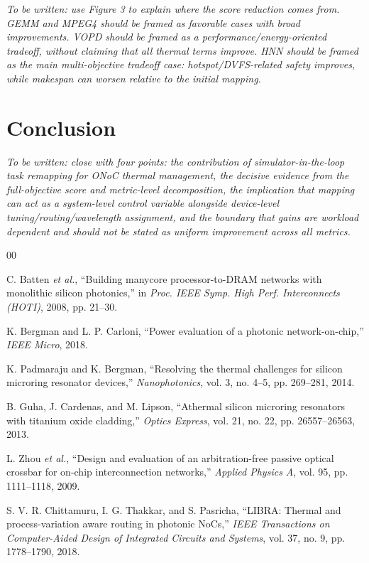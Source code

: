 \documentclass[conference]{IEEEtran}
\begin{document}
\noindent\textit{To be written: use Figure 3 to explain where the score reduction comes from. GEMM and MPEG4 should be framed as favorable cases with broad improvements. VOPD should be framed as a performance/energy-oriented tradeoff, without claiming that all thermal terms improve. HNN should be framed as the main multi-objective tradeoff case: hotspot/DVFS-related safety improves, while makespan can worsen relative to the initial mapping.}

\section{Conclusion}

\noindent\textit{To be written: close with four points: the contribution of simulator-in-the-loop task remapping for ONoC thermal management, the decisive evidence from the full-objective score and metric-level decomposition, the implication that mapping can act as a system-level control variable alongside device-level tuning/routing/wavelength assignment, and the boundary that gains are workload dependent and should not be stated as uniform improvement across all metrics.}

\begin{thebibliography}{00}

C. Batten \emph{et al.},
``Building manycore processor-to-DRAM networks with monolithic silicon photonics,''
in \emph{Proc. IEEE Symp. High Perf. Interconnects (HOTI)}, 2008, pp. 21--30.

K. Bergman and L. P. Carloni,
``Power evaluation of a photonic network-on-chip,''
\emph{IEEE Micro}, 2018.

K. Padmaraju and K. Bergman,
``Resolving the thermal challenges for silicon microring resonator devices,''
\emph{Nanophotonics}, vol. 3, no. 4--5, pp. 269--281, 2014.

B. Guha, J. Cardenas, and M. Lipson,
``Athermal silicon microring resonators with titanium oxide cladding,''
\emph{Optics Express}, vol. 21, no. 22, pp. 26557--26563, 2013.

L. Zhou \emph{et al.},
``Design and evaluation of an arbitration-free passive optical crossbar for on-chip interconnection networks,''
\emph{Applied Physics A}, vol. 95, pp. 1111--1118, 2009.

S. V. R. Chittamuru, I. G. Thakkar, and S. Pasricha,
``LIBRA: Thermal and process-variation aware routing in photonic NoCs,''
\emph{IEEE Transactions on Computer-Aided Design of Integrated Circuits and Systems}, vol. 37, no. 9, pp. 1778--1790, 2018.

\end{thebibliography}
\end{document}
